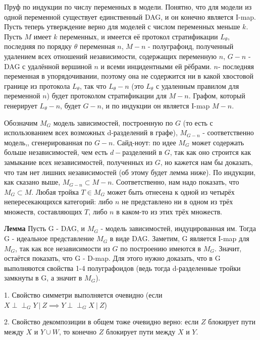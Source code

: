 \documentclass[fleqn]{article}
\newcommand{\indepg}{\perp \!\!\! \perp_G}
\begin{document}
Пруф по индукции по числу переменных в модели. Понятно, что для модели из одной переменной существует единственный DAG, и он конечно является I-map. Пусть теперь утверждение верно для моделей с числом переменных меньше $k$. Пусть $M$ имеет $k$ переменных, и имеется её протокол стратификации $L_\theta$, последняя по порядку $\theta$ переменная $n$, $M-n$ - полуграфоид, полученный удалением всех отношений независимости, содержащих переменную $n$, $G-n$ - DAG с удалённой вершиной $n$  и всеми инцидентными ей рёбрами. $n$- последняя переменная в упорядочивании, поэтому она не содержится ни в какой хвостовой границе из протокола $L_\theta$, так что $L_\theta - n$ (это $L_\theta$ с удаленным правилом для переменной $n$) будет протоколом стратификации для $M-n$. Графом, который генерирует $L_\theta-n$, будет $G-n$, и по индукции он является I-map $M-n$. 

Обозначим $M_G$ модель зависимостей, построенную по $G$ (то есть с использованием всех возможных d-разделений в графе), $M_{G-n}$ - соответственно модель,, сгенерированная по $G-n$. Сайд-ноут: по идее $M_G$ может содержать больше независимостей, чем есть $d-$разделений в $G$, так как оно строится как замыкание всех независимостей, полученных из $G$, но кажется нам бы доказать, что там нет лишних независимостей (об этому будет лемма ниже). По индукции, как сказано выше, $M_{G-n} \subset M-n$. Соответственно, нам надо показать, что $M_{G} \subset M$. Любая тройка $T \in M_G$ может быть отнесена к одной из четырёх непересекающихся категорий: либо $n$ не представлено ни в одном из трёх множеств, составляющих $T$, либо $n$ в каком-то из этих трёх множеств.

\textbf{Лемма} Пусть G - DAG, и $M_G$ - модель зависимостей, индуцированная им. Тогда G - идеальное представление $M_G$ в виде DAG.
Заметим, G является I-map для $M_G$, так как все независимости из $G$ по построению имеются в $M_G$. Значит, остаётся показать, что G - D-map. Для этого нужно доказать, что в G выполняются свойства 1-4 полуграфоидов (ведь тогда d-разделенные тройки замкнуты в G, а значит в $M_G$).

1. Свойство симметри выполняется очевидно (если $X \indepg Y \ | \ Z \implies Y \indepg X \ | \ Z$)

2. Свойство декомпозиции в общем тоже очевидно верно: если $Z$ блокирует пути между $X$ и $Y\cup W$, то конечно $Z$ блокирует пути между $X$ и $Y$.
\end{document}

